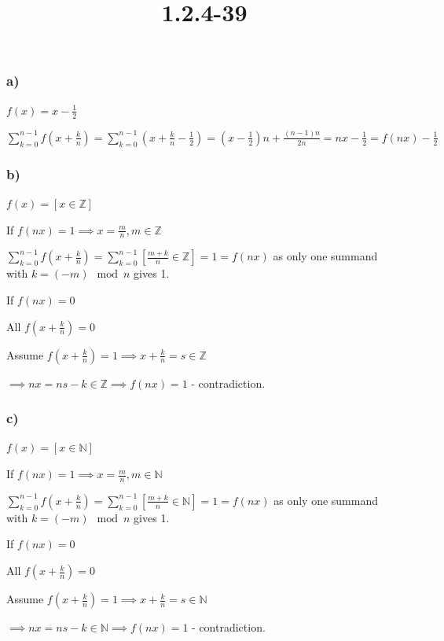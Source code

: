 \documentclass{article}
\title{1.2.4-39}
\begin{document}
\maketitle

\subsubsection*{a)}

\( f(x) = x - \frac{1}{2} \)

\( \sum_{k=0}^{n-1} f(x+\frac{k}{n}) = \sum_{k=0}^{n-1} (x+\frac{k}{n}-\frac{1}{2}) = (x-\frac{1}{2})n + \frac{(n-1)n}{2n} = nx - \frac{1}{2} = f(nx) - \frac{1}{2} \)

\subsubsection*{b)}

\( f(x) = [x \in \mathbb{Z}] \)

If \( f(nx) = 1 \implies x = \frac{m}{n}, m \in \mathbb{Z} \)

\( \sum_{k=0}^{n-1} f(x+\frac{k}{n}) = \sum_{k=0}^{n-1} [\frac{m+k}{n} \in \mathbb{Z}] = 1 = f(nx) \) as only one summand with \( k = (-m) \mod n \) gives 1.

If \( f(nx) = 0 \)

All \( f(x+\frac{k}{n}) = 0 \)

Assume \( f(x+\frac{k}{n}) = 1 \implies x + \frac{k}{n} = s \in \mathbb{Z} \)

\( \implies nx = ns - k \in \mathbb{Z} \implies f(nx) = 1 \) - contradiction.

\subsubsection*{c)}

\( f(x) = [x \in \mathbb{N}] \)

If \( f(nx) = 1 \implies x = \frac{m}{n}, m \in \mathbb{N} \)

\( \sum_{k=0}^{n-1} f(x+\frac{k}{n}) = \sum_{k=0}^{n-1} [\frac{m+k}{n} \in \mathbb{N}] = 1 = f(nx) \) as only one summand with \( k = (-m) \mod n \) gives 1.

If \( f(nx) = 0 \)

All \( f(x+\frac{k}{n}) = 0 \)

Assume \( f(x+\frac{k}{n}) = 1 \implies x + \frac{k}{n} = s \in \mathbb{N} \)

\( \implies nx = ns - k \in \mathbb{N} \implies f(nx) = 1 \) - contradiction.
\end{document}
